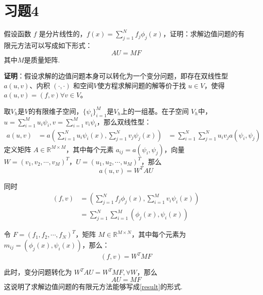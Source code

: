 \documentclass[11pt]{ctexart}
\begin{document}
\section{习题4}

假设函数 $f$ 是分片线性的，$f(x) = \sum_{j = 1}^N f_j \phi_j(x)$，证明：求解边值问题的有限元方法可以写成如下形式：
$$ A U = M F $$
其中$M$是质量矩阵.

{\flushleft \textbf{证明}：}假设求解的边值问题本身可以转化为一个变分问题，即存在双线性型$a(u,v)$、内积 $( \cdot, \cdot)$ 和空间$V$使方程求解问题的解等价于找 $u\in V$，使得$a(u,v) = (f, v) \forall v \in V$。

取$V_h$是$V$的有限维子空间，$\{\psi_i\}_{i=1}^M$是$V_h$上的一组基。在子空间 $V_h$中，$u = \sum_{i=1}^M u_i \psi_i, v = \sum_{i = 1}^M v_i \psi_i$，那么双线性型：
\begin{equation}
\begin{aligned}
  a(u, v) &= a(\sum_{i=1}^N u_i \psi_i(x), \sum_{j=1}^N v_j \psi_j(x))
  &= \sum_{i=1}^N \sum_{j=1}^N u_i v_j a(\psi_i, \psi_j)
\end{aligned}
\end{equation}
定义矩阵 $A\in \mathbb{R}^{M\times M}$，其中每个元素 $a_{ij} = a(\psi_i, \psi_j)$，向量$W = (v_1, v_2, \cdots, v_M)^T$，$U = (u_1, u_2, \cdots, u_M)^T$，那么
\begin{equation}
  a(u,v) = W^T A U
\end{equation}

同时\begin{equation}
\begin{aligned}
  (f, v) &= \left(\sum_{j=1}^N f_j \phi_j(x), \sum_{i=1}^M v_i \psi_i(x)\right)\\
  &= \sum_{j=1}^N\sum_{i=1}^M (\phi_j(x), \psi_i(x))
\end{aligned}
\end{equation}

令 $F = (f_1, f_2, \cdots, f_N)^T$，矩阵 $M\in \mathbb{R}^{M \times N}$，其中每个元素为 $m_{ij} = (\phi_j(x), \psi_i(x))$，那么：
\begin{equation}
  (f,v) = W^T M F
\end{equation}

此时，变分问题转化为 $W^T A U = W^T M F,\forall W$，那么
\begin{equation}
  AU = MF\label{result}
\end{equation}
这说明了求解边值问题的有限元方法能够写成\eqref{result}的形式.
\end{document}
